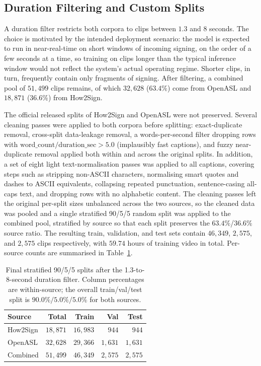 \documentclass{article}
\begin{document}
\subsection{Duration Filtering and Custom Splits}
\label{sec:data-splits}

A duration filter restricts both corpora to clips between $1.3$ and $8$
seconds. The choice is motivated by the intended deployment scenario: the
model is expected to run in near-real-time on short windows of incoming
signing, on the order of a few seconds at a time, so training on clips
longer than the typical inference window would not reflect the system's
actual operating regime. Shorter clips, in turn, frequently contain only
fragments of signing. After filtering, a combined pool of $51{,}499$ clips
remains, of which $32{,}628$ ($63.4\%$) come from OpenASL and $18{,}871$
($36.6\%$) from How2Sign.

The official released splits of How2Sign and OpenASL were not preserved.
Several cleaning passes were applied to both corpora before splitting:
exact-duplicate removal, cross-split data-leakage removal, a words-per-second
filter dropping rows with $\mathrm{word\_count} / \mathrm{duration\_sec} > 5.0$
(implausibly fast captions), and fuzzy near-duplicate removal applied both
within and across the original splits. In addition, a set of eight light
text-normalisation passes was applied to all captions, covering steps such as
stripping non-ASCII characters, normalising smart quotes and dashes to ASCII
equivalents, collapsing repeated punctuation, sentence-casing all-caps text,
and dropping rows with no alphabetic content. The cleaning passes left the
original per-split sizes unbalanced across the two sources, so the cleaned
data was pooled and a single stratified 90/5/5 random split was applied to
the combined pool, stratified by source so that each split preserves the
$63.4\%$/$36.6\%$ source ratio.
The resulting train, validation, and test sets contain $46{,}349$, $2{,}575$,
and $2{,}575$ clips respectively, with $59.74$ hours of training video in
total. Per-source counts are summarised in Table~\ref{tab:dataset-splits}.

\begin{table}[h]
\centering
\caption{Final stratified 90/5/5 splits after the 1.3-to-8-second duration
filter. Column percentages are within-source; the overall train/val/test
split is $90.0\%/5.0\%/5.0\%$ for both sources.}
\label{tab:dataset-splits}
\begin{tabular}{l r r r r}
\toprule
Source     & Total      & Train      & Val      & Test     \\
\midrule
How2Sign   & $18{,}871$ & $16{,}983$ & $944$    & $944$    \\
OpenASL    & $32{,}628$ & $29{,}366$ & $1{,}631$& $1{,}631$\\
\midrule
Combined   & $51{,}499$ & $46{,}349$ & $2{,}575$& $2{,}575$\\
\bottomrule
\end{tabular}
\end{table}
\end{document}
